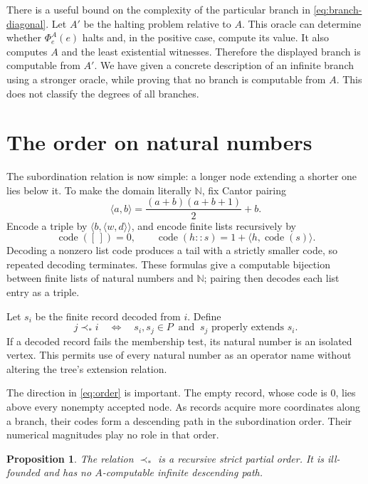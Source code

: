\documentclass[11pt]{article}
\newtheorem{proposition}[theorem]{Proposition}
\theoremstyle{definition}
\newcommand{\N}{\mathbb N}
\newcommand{\seqcode}[1]{\operatorname{code}(#1)}
\begin{document}
There is a useful bound on the complexity of the particular branch in
\eqref{eq:branch-diagonal}. Let $A'$ be the halting problem relative to
$A$. This oracle can determine whether $\Phi_e^A(e)$ halts and, in the
positive case, compute its value. It also computes $A$ and the least
existential witnesses. Therefore the displayed branch is computable from
$A'$. We have given a concrete description of an infinite branch using a
stronger oracle, while proving that no branch is computable from $A$.
This does not classify the degrees of all branches.

\section{The order on natural numbers}\label{sec:order}

The subordination relation is now simple: a longer node extending a shorter
one lies below it. To make the domain literally $\N$, fix Cantor pairing
\[
 \langle a,b\rangle=\frac{(a+b)(a+b+1)}{2}+b.
\]
Encode a triple by $\langle b,\langle w,d\rangle\rangle$, and encode
finite lists recursively by
\begin{equation}\label{eq:list-code}
 \seqcode{[\,]}=0,\qquad
 \seqcode{h::s}=1+\langle h,\seqcode{s}\rangle.
\end{equation}
Decoding a nonzero list code produces a tail with a strictly smaller
code, so repeated decoding terminates. These formulas give a computable
bijection between finite lists of natural numbers and $\N$; pairing then
decodes each list entry as a triple.

Let $s_i$ be the finite record decoded from $i$. Define
\begin{equation}\label{eq:order}
 j\prec_*i
 \quad\Longleftrightarrow\quad
 s_i,s_j\in P\ \text{ and }\ s_j\text{ properly extends }s_i.
\end{equation}
If a decoded record fails the membership test, its natural number is an
isolated vertex. This permits use of every natural number as an operator
name without altering the tree's extension relation.

The direction in \eqref{eq:order} is important. The empty record, whose
code is $0$, lies above every nonempty accepted node. As records acquire
more coordinates along a branch, their codes form a descending path in
the subordination order. Their numerical magnitudes play no role in that
order.

\begin{proposition}\label{prop:order}
The relation $\prec_*$ is a recursive strict partial order. It is
ill-founded and has no $A$-computable infinite descending path.
\end{proposition}
\end{document}
